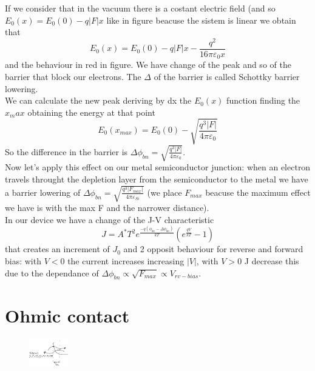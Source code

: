 If we consider that in the vacuum there is a costant electric field (and so $E_0(x)=E_0(0)-q|F|x$ like in figure beacuse the sistem is linear we obtain that
\begin{equation}
E_0(x)=E_0(0)-q|F|x-\frac{q^2}{16 \pi \varepsilon_0 x}
\end{equation}
and the behaviour in red in figure. We have change of the peak and so of the barrier that block our electrons. The $\Delta$ of the barrier is called Schottky barrier lowering.\\
We can calculate the new peak deriving by dx the $E_0(x)$ function finding the $x_max$ obtaining the energy at that point 
\begin{equation}
E_0(x_{max})=E_0(0)-\sqrt{\frac{q^3|F|}{4\pi \varepsilon_0}}
\end{equation}
So the difference in the barrier is $\Delta\phi_{bn}=\sqrt{\frac{q^3|F|}{4\pi \varepsilon_0}}$.\\
Now let's apply this effect on our metal semiconductor junction: when an electron travels throught the depletion layer from the semiconductor to the metal we have a barrier lowering of $\Delta\phi_{bn}=\sqrt{\frac{q^3|F_{max}|}{4\pi \varepsilon_{Si}}}$ (we place $F_{max}$ beacuse the maximum effect we have is with the max F and the narrower distance).\\
In our device we have a change of the J-V characteristic 
\begin{equation}
J=A^*T^2e^{\frac{-q(\phi_{bn}-\Delta\phi_{bn})}{kT}}(e^{\frac{qV}{kT}}-1)
\end{equation}
that creates an increment of $J_0$ and 2 opposit behaviour for reverse and forward bias: with $V<0$ the current increases increasing $|V|$, with $V>0$ J decrease this due to the dependance of $\Delta\phi_{bn}\propto\sqrt{F_{max}}\propto V_{rv-bias}$.\\

\section{Ohmic contact}

\begin{figure}
\includegraphics[width=0.15\textwidth]{tunnel.png}
\end{figure}

